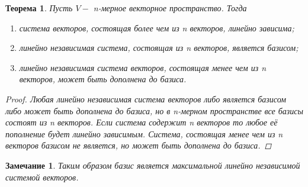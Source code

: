 \documentclass[../../main.tex]{subfiles}
\begin{document}
\newtheorem*{t3}{Теорема}
\begin{t3}
Пусть $V-$ n-мерное векторное пространство. Тогда
\begin{enumerate}
\item система векторов, состоящая более чем из n векторов, линейно зависима;
\item линейно независимая система, состоящая из n векторов, является базисом;
\item линейно независимая система векторов, состоящая менее чем из n векторов, может быть дополнена до базиса.
\end{enumerate}
\begin{proof}
 Любая линейно независимая система векторов либо является базисом либо может быть дополнена до базиса, но в n-мерном пространстве все базисы состоят из n векторов.
Если система содержит n векторов то любое её пополнение будет линейно зависимым.
Система, состоящая менее чем из n векторов базисом не является, но может быть дополнена до базиса.
\end{proof}   
\end{t3}


\newtheorem*{Comment}{Замечание}
\begin{Comment}
Таким образом базис является максимальной линейно независимой системой векторов.
\end{Comment}
\end{document}
